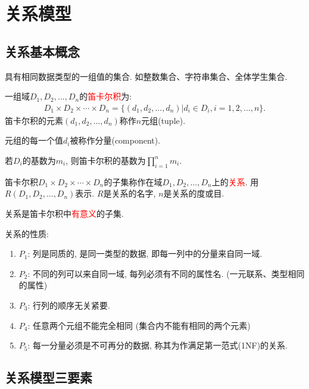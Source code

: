 \chapter{关系模型}

\section{关系基本概念}

\begin{definition}[域(Domain)]
具有相同数据类型的一组值的集合.
如整数集合、字符串集合、全体学生集合.
\end{definition}

\begin{definition}
一组域$D_1,D_2,...,D_n$的\textcolor{red}{笛卡尔积}为:
\begin{align*}
    D_1\times D_2\times \cdots\times D_n = \{(d_1,d_2,...,d_n)|d_i\in D_i, i=1,2,...,n\}.
\end{align*}
笛卡尔积的元素$(d_1,d_2,...,d_n)$称作$n$元组(tuple).

元组的每一个值$d_i$被称作分量(component).

若$D_i$的基数为$m_i$, 则笛卡尔积的基数为$\prod_{i=1}^{n}m_i$.
\end{definition}

\begin{definition}[关系]
笛卡尔积$D_1\times D_2\times \cdots\times D_n$的子集称作在域$D_1,D_2,...,D_n$上的\textcolor{red}{关系}. 用$R(D_1,D_2,...,D_n)$表示. $R$是关系的名字, $n$是关系的度或目.

关系是笛卡尔积中\textcolor{red}{有意义}的子集.
\end{definition}

关系的性质:
\begin{enumerate}
    \item $P_1$: 列是同质的, 是同一类型的数据, 即每一列中的分量来自同一域.
    \item $P_2$: 不同的列可以来自同一域, 每列必须有不同的属性名. (一元联系、类型相同的属性)
    \item $P_3$: 行列的顺序无关紧要.
    \item $P_4$: 任意两个元组不能完全相同 (集合内不能有相同的两个元素)
    \item $P_5$: 每一分量必须是不可再分的数据, 称其为作满足第一范式(1NF)的关系. 
\end{enumerate}

\section{关系模型三要素}


